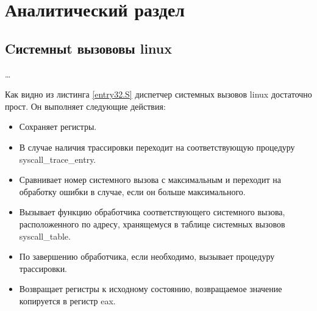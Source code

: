 \chapter{Аналитический раздел}
\label{cha:analysis}

\section{Cистемныt вызововы linux}


\dots



Как видно из листинга \ref{entry32.S} диспетчер системных вызовов linux достаточно прост. 
Он выполняет следующие действия:
\begin{itemize}
\item Сохраняет регистры.
\item В случае наличия трассировки переходит на соответствующую процедуру 
syscall_trace_entry.
\item Сравнивает номер системного вызова с максимальным и переходит на обработку ошибки 
в случае, если он больше максимального.
\item Вызывает функцию обработчика соответствующего системного вызова, расположенного
по адресу, хранящемуся в таблице системных вызовов syscall_table.
\item По завершению обработчика, если необходимо, вызывает процедуру трассировки.
\item Возвращает регистры к исходному состоянию, возвращаемое значение копируется в регистр eax.
\end{itemize}


